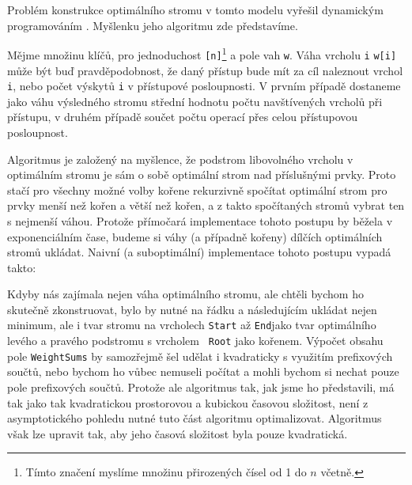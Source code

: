 Problém konstrukce optimálního stromu v tomto modelu vyřešil dynamickým
programováním \citet{staticoptimality}. Myšlenku jeho algoritmu zde představíme.

Mějme množinu klíčů, pro jednoduchost {\tt [n]}\footnote{Tímto značení myslíme
množinu přirozených čísel od 1 do $n$ včetně.} a pole vah {\tt w}. Váha vrcholu
{\tt i} {\tt w[i]} může být buď pravděpodobnost, že daný přístup bude mít za
cíl naleznout vrchol {\tt i}, nebo počet výskytů {\tt i} v přístupové
posloupnosti. V prvním případě dostaneme jako váhu výsledného stromu střední
hodnotu počtu navštívených vrcholů při přístupu, v druhém případě součet počtu operací přes
celou přístupovou posloupnost.

Algoritmus je založený na myšlence, že podstrom libovolného vrcholu v
optimálním stromu je sám o sobě optimální strom nad příslušnými prvky. Proto
stačí pro všechny možné volby kořene rekurzivně spočítat optimální strom pro
prvky menší než kořen a větší než kořen, a z takto spočítaných stromů vybrat
ten s nejmenší váhou. Protože přímočará implementace tohoto postupu by běžela v
exponenciálním čase, budeme si váhy (a případně kořeny) dílčích optimálních
stromů ukládat. Naivní (a suboptimální) implementace tohoto postupu vypadá
takto:


Kdyby nás zajímala nejen váha optimálního stromu, ale chtěli bychom ho skutečně
zkonstruovat, bylo by nutné na řádku  a
následujícím ukládat nejen minimum, ale i tvar stromu na vrcholech {\tt Start}
až {\tt End}jako tvar optimálního levého a pravého podstromu s vrcholem {\tt
Root} jako kořenem. Výpočet obsahu pole {\tt WeightSums} by samozřejmě šel
udělat i kvadraticky s využitím prefixových součtů, nebo bychom ho vůbec
nemuseli počítat a mohli bychom si nechat pouze pole prefixových součtů.
Protože ale algoritmus tak, jak jsme ho představili, má tak jako tak kvadratickou prostorovou a kubickou
časovou složitost, není z asymptotického pohledu nutné tuto část algoritmu
optimalizovat. Algoritmus však lze upravit tak, aby jeho časová složitost byla pouze kvadratická.



